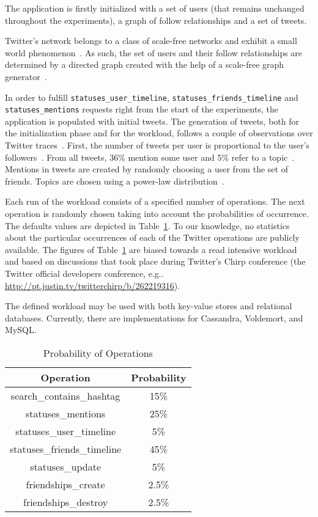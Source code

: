 \documentclass[12pt]{article}
\begin{document}
The application is firstly initialized with a set of users (that remains unchanged throughout the experiments), a graph of follow relationships and a set of tweets. 

Twitter's network belongs to a class of scale-free networks and exhibit
a small world phenomenon~\cite{whyWeTwitter}. As such, the set of users and their follow relationships are determined by a directed graph created with the help of a scale-free graph generator~\cite{scaleFree}.

In order to fulfill \verb+statuses_user_timeline+, \verb+statuses_friends_timeline+ and \verb+statuses_mentions+ requests right from the start of the experiments, the application is populated with initial tweets. The generation of tweets, both for the initialization phase and for the workload, follows a couple of observations over Twitter traces~\cite{chipsTwitter,retweet}. First, the number of tweets per user is proportional to the user's followers~\cite{chipsTwitter}. From all tweets, 36\% mention some user and 5\% refer to a topic~\cite{retweet}. Mentions in tweets are created by randomly choosing a user from the set of friends. Topics are chosen using a power-law distribution~\cite{whyWeTwitter}.

Each run of the workload consists of a specified number of operations. The next operation is randomly chosen taking into account the probabilities of occurrence. The defaults values are depicted in Table~\ref{tab:operations}. To our knowledge, no statistics about the particular occurrences of each of the Twitter operations are publicly available. The figures of Table~\ref{tab:operations} are biased towards a read intensive workload and based on discussions that took place during Twitter's Chirp conference (the Twitter official developers conference, e.g.. \url{http://pt.justin.tv/twitterchirp/b/262219316}). 

The defined workload may be used with both key-value stores 
and relational databases. Currently, there are implementations for Cassandra, Voldemort, and MySQL.

\begin{table}
\centering
\caption{Probability of Operations}
\begin{tabular}{|c|c|} \hline
Operation&Probability\\ \hline
search\_contains\_hashtag & 15\% \\ \hline
statuses\_mentions & 25\% \\ \hline
statuses\_user\_timeline & 5\% \\ \hline
statuses\_friends\_timeline & 45\% \\ \hline
statuses\_update & 5\% \\ \hline
friendships\_create & 2.5\% \\ \hline
friendships\_destroy & 2.5\% \\
\hline\end{tabular}
\label{tab:operations}
\end{table}



\end{document}
